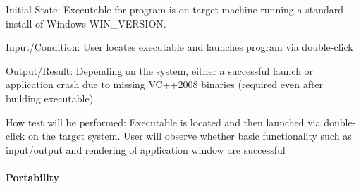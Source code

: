 \documentclass[12pt, titlepage]{article}
\begin{document}
\begin{enumerate}
		Initial State: Executable for program is on target machine running a
		standard install of Windows WIN\_VERSION.
		
		Input/Condition: User locates executable and launches program via double-click
		
		Output/Result: Depending on the system, either a successful launch or
		application crash due to missing VC++2008 binaries (required even after 
		building executable)
		
		How test will be performed: Executable is located and then launched via
		double-click on the target system. User will observe whether basic
		functionality such as input/output and rendering of application window are
		successful
	\end{enumerate}

	\paragraph{Portability}
\end{document}
